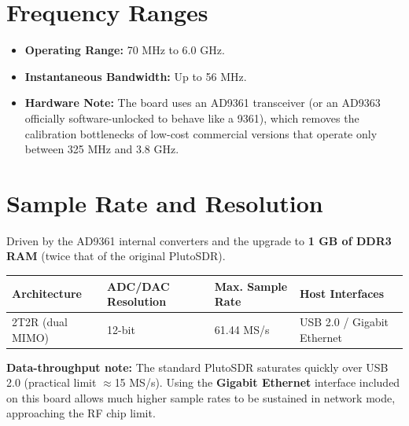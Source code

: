 \documentclass[11pt]{article}
\begin{document}
\section{Frequency Ranges}

\begin{itemize}
    \item \textbf{Operating Range:} 70 MHz to 6.0 GHz.
    \item \textbf{Instantaneous Bandwidth:} Up to 56 MHz.
    \item \textbf{Hardware Note:} The board uses an AD9361 transceiver (or an AD9363 officially software-unlocked to behave like a 9361), which removes the calibration bottlenecks of low-cost commercial versions that operate only between 325 MHz and 3.8 GHz.
\end{itemize}

\section{Sample Rate and Resolution}

Driven by the AD9361 internal converters and the upgrade to \textbf{1 GB of DDR3 RAM} (twice that of the original PlutoSDR).

\begin{table}[h]
    \centering
    \small
    \begin{tabular}{@{}p{}p{}p{}p{}@{}}
        \toprule
        \textbf{Architecture} & \textbf{ADC/DAC Resolution} & \textbf{Max. Sample Rate} & \textbf{Host Interfaces} \\
        \midrule
        2T2R (dual MIMO) & 12-bit & 61.44 MS/s & USB 2.0 / Gigabit Ethernet \\
        \bottomrule
    \end{tabular}
\end{table}

\textbf{Data-throughput note:} The standard PlutoSDR saturates quickly over USB 2.0 (practical limit $\approx$15 MS/s). Using the \textbf{Gigabit Ethernet} interface included on this board allows much higher sample rates to be sustained in network mode, approaching the RF chip limit.

\end{document}
